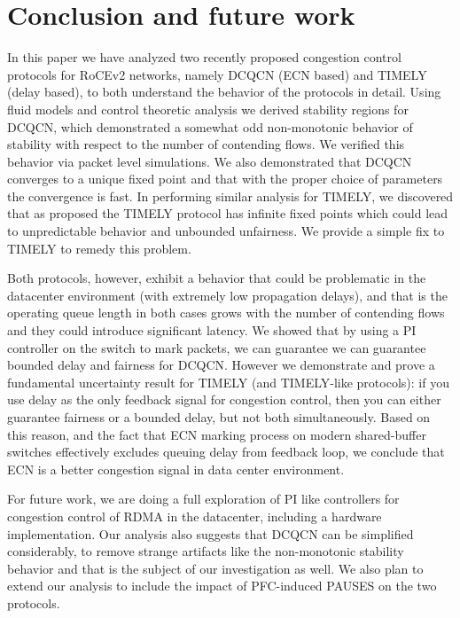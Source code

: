 \section{Conclusion and future work}
In this paper we have analyzed two recently proposed congestion control
protocols for RoCEv2 networks, namely DCQCN (ECN based) and TIMELY (delay
based), to both understand the behavior of the protocols in detail.  Using fluid
models and control theoretic analysis we derived stability regions for DCQCN,
which demonstrated a somewhat odd non-monotonic behavior of stability with
respect to the number of contending flows. We verified this behavior via packet
level simulations. We also demonstrated that DCQCN converges to a unique fixed
point and that with the proper choice of parameters the convergence is fast. In
performing similar analysis for TIMELY, we discovered that as proposed the
TIMELY protocol has infinite fixed points which could lead to unpredictable
behavior and unbounded unfairness. We provide a simple fix to TIMELY to remedy
this problem.

Both protocols, however, exhibit a behavior that could be problematic in the
datacenter environment (with extremely low propagation delays), and that is the
operating queue length in both cases grows with the number of contending flows
and they could introduce significant latency. We showed that by using a PI
controller on the switch to mark packets, we can guarantee  we can guarantee
bounded delay and fairness for DCQCN.  However we demonstrate and prove a
fundamental uncertainty result for TIMELY (and TIMELY-like protocols): if you
use delay as the only feedback signal for congestion control, then you can
either guarantee fairness or a bounded delay, but not both simultaneously. Based
on this reason, and the fact that ECN marking process on modern shared-buffer
switches effectively excludes queuing delay from feedback loop, we conclude
that ECN is a better congestion signal in data center environment. 

For future work, we are doing a full exploration of PI like controllers for
congestion control of RDMA in the datacenter, including a hardware
implementation. Our analysis also suggests that DCQCN can be simplified
considerably, to remove strange artifacts like the non-monotonic stability
behavior and that is the subject of our investigation as well.  We also plan to
extend our analysis to include the impact of PFC-induced PAUSES on the two
protocols.


